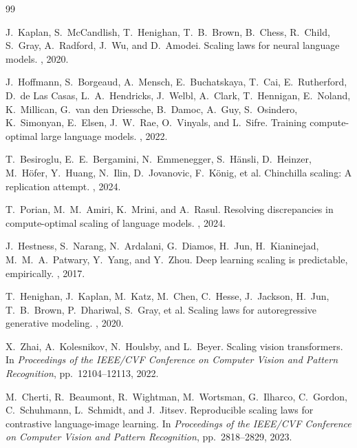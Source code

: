 \documentclass[12pt,a4paper]{article}
\theoremstyle{remark}
\begin{document}
\begin{thebibliography}{99}

J.\ Kaplan, S.\ McCandlish, T.\ Henighan, T.\ B.\ Brown, B.\ Chess, R.\ Child, S.\ Gray, A.\ Radford, J.\ Wu, and D.\ Amodei.
\newblock Scaling laws for neural language models.
, 2020.

J.\ Hoffmann, S.\ Borgeaud, A.\ Mensch, E.\ Buchatskaya, T.\ Cai, E.\ Rutherford, D.\ de Las Casas, L.\ A.\ Hendricks, J.\ Welbl, A.\ Clark, T.\ Hennigan, E.\ Noland, K.\ Millican, G.\ van den Driessche, B.\ Damoc, A.\ Guy, S.\ Osindero, K.\ Simonyan, E.\ Elsen, J.\ W.\ Rae, O.\ Vinyals, and L.\ Sifre.
\newblock Training compute-optimal large language models.
, 2022.

T.\ Besiroglu, E.\ E.\ Bergamini, N.\ Emmenegger, S.\ H\"{a}nsli, D.\ Heinzer, M.\ H\"{o}fer, Y.\ Huang, N.\ Ilin, D.\ Jovanovic, F.\ K\"{o}nig, et al.
\newblock Chinchilla scaling: A replication attempt.
, 2024.

T.\ Porian, M.\ M.\ Amiri, K.\ Mrini, and A.\ Rasul.
\newblock Resolving discrepancies in compute-optimal scaling of language models.
, 2024.

J.\ Hestness, S.\ Narang, N.\ Ardalani, G.\ Diamos, H.\ Jun, H.\ Kianinejad, M.\ M.\ A.\ Patwary, Y.\ Yang, and Y.\ Zhou.
\newblock Deep learning scaling is predictable, empirically.
, 2017.

T.\ Henighan, J.\ Kaplan, M.\ Katz, M.\ Chen, C.\ Hesse, J.\ Jackson, H.\ Jun, T.\ B.\ Brown, P.\ Dhariwal, S.\ Gray, et al.
\newblock Scaling laws for autoregressive generative modeling.
, 2020.

X.\ Zhai, A.\ Kolesnikov, N.\ Houlsby, and L.\ Beyer.
\newblock Scaling vision transformers.
\newblock In {\em Proceedings of the IEEE/CVF Conference on Computer Vision and Pattern Recognition}, pp.\ 12104--12113, 2022.

M.\ Cherti, R.\ Beaumont, R.\ Wightman, M.\ Wortsman, G.\ Ilharco, C.\ Gordon, C.\ Schuhmann, L.\ Schmidt, and J.\ Jitsev.
\newblock Reproducible scaling laws for contrastive language-image learning.
\newblock In {\em Proceedings of the IEEE/CVF Conference on Computer Vision and Pattern Recognition}, pp.\ 2818--2829, 2023.


\end{thebibliography}
\end{document}
